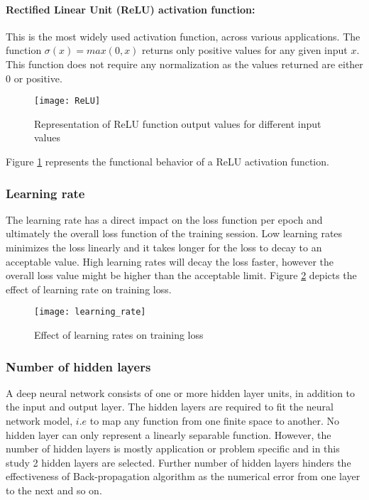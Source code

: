 \paragraph{Rectified Linear Unit (ReLU) activation function:}
This is the most widely used activation function, across various applications. The function $\sigma(x) = max(0,x)$ returns only positive values for any given input $x$. This function does not require any normalization as the values returned are either $0$ or positive.
\begin{figure}[h]
\centering
\texttt{[image: ReLU]}
\caption{Representation of ReLU function output values for different input values}
\label{fig:2.13}
\end{figure}    
Figure \ref{fig:2.13} represents the functional behavior of a ReLU activation function.
\subsubsection{Learning rate}    
The learning rate has a direct impact on the loss function per epoch and ultimately the overall loss function of the training session. Low learning rates minimizes the loss linearly and it takes longer for the loss to decay to an acceptable value. High learning rates will decay the loss faster, however the overall loss value might be higher than the acceptable limit. Figure \ref{fig:2.14} depicts the effect of learning rate on training loss.
\begin{figure}[h]
\centering
\texttt{[image: learning\_rate]}
\caption{Effect of learning rates on training loss}
\label{fig:2.14}
\end{figure}
\subsubsection{Number of hidden layers}
A deep neural network consists of one or more hidden layer units, in addition to the input and output layer. The hidden layers are required to fit the neural network model, $i.e$ to map any function from one finite space to another. No hidden layer can only represent a linearly separable function. However, the number of hidden layers is mostly application or problem specific and in this study 2 hidden layers are selected. Further number of hidden layers hinders the effectiveness of Back-propagation algorithm as the numerical error from one layer to the next and so on.  








